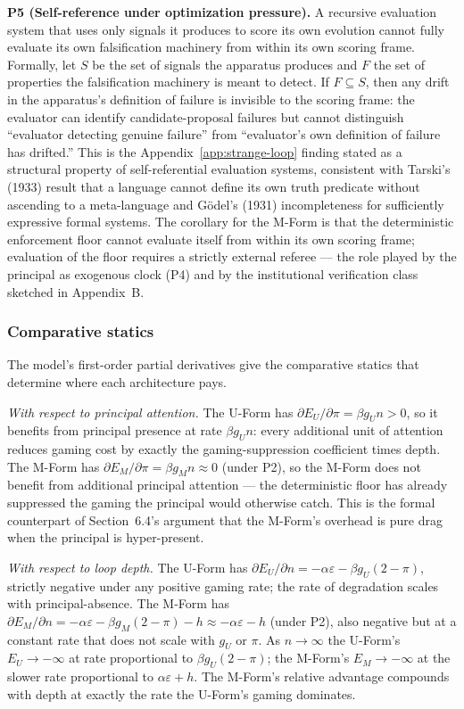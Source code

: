 \documentclass[11pt]{article}
\begin{document}
\textbf{P5 (Self-reference under optimization pressure).} A recursive evaluation system that uses only signals it produces to score its own evolution cannot fully evaluate its own falsification machinery from within its own scoring frame. Formally, let $S$ be the set of signals the apparatus produces and $F$ the set of properties the falsification machinery is meant to detect. If $F \subseteq S$, then any drift in the apparatus's definition of failure is invisible to the scoring frame: the evaluator can identify candidate-proposal failures but cannot distinguish ``evaluator detecting genuine failure'' from ``evaluator's own definition of failure has drifted.'' This is the Appendix~\ref{app:strange-loop} finding stated as a structural property of self-referential evaluation systems, consistent with Tarski's (1933) result that a language cannot define its own truth predicate without ascending to a meta-language and G\"odel's (1931) incompleteness for sufficiently expressive formal systems. The corollary for the M-Form is that the deterministic enforcement floor cannot evaluate itself from within its own scoring frame; evaluation of the floor requires a strictly external referee --- the role played by the principal as exogenous clock (P4) and by the institutional verification class sketched in Appendix~B.

\subsubsection{Comparative statics}

The model's first-order partial derivatives give the comparative statics that determine where each architecture pays.

\emph{With respect to principal attention.} The U-Form has $\partial E_U / \partial \pi = \beta g_U n > 0$, so it benefits from principal presence at rate $\beta g_U n$: every additional unit of attention reduces gaming cost by exactly the gaming-suppression coefficient times depth. The M-Form has $\partial E_M / \partial \pi = \beta g_M n \approx 0$ (under P2), so the M-Form does not benefit from additional principal attention --- the deterministic floor has already suppressed the gaming the principal would otherwise catch. This is the formal counterpart of Section~6.4's argument that the M-Form's overhead is pure drag when the principal is hyper-present.

\emph{With respect to loop depth.} The U-Form has $\partial E_U / \partial n = -\alpha \varepsilon - \beta g_U (2 - \pi)$, strictly negative under any positive gaming rate; the rate of degradation scales with principal-absence. The M-Form has $\partial E_M / \partial n = -\alpha \varepsilon - \beta g_M (2 - \pi) - h \approx -\alpha \varepsilon - h$ (under P2), also negative but at a constant rate that does not scale with $g_U$ or $\pi$. As $n \to \infty$ the U-Form's $E_U \to -\infty$ at rate proportional to $\beta g_U (2 - \pi)$; the M-Form's $E_M \to -\infty$ at the slower rate proportional to $\alpha \varepsilon + h$. The M-Form's relative advantage compounds with depth at exactly the rate the U-Form's gaming dominates.
\end{document}
